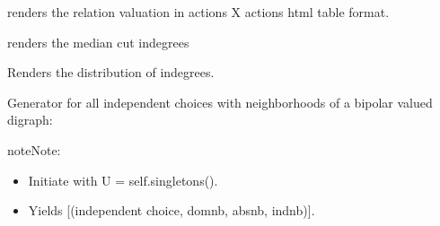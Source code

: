 \documentclass[letterpaper,10pt,english]{sphinxmanual}
\begin{document}
\begin{fulllineitems}
\begin{fulllineitems}
\end{fulllineitems}


\begin{fulllineitems}
\label{techDoc:digraphs.Digraph.htmlRelationTable}
renders the relation valuation in actions X actions html table format.

\end{fulllineitems}


\begin{fulllineitems}
\label{techDoc:digraphs.Digraph.inDegrees}
renders the median cut indegrees

\end{fulllineitems}


\begin{fulllineitems}
\label{techDoc:digraphs.Digraph.inDegreesDistribution}
Renders the distribution of indegrees.

\end{fulllineitems}


\begin{fulllineitems}
\label{techDoc:digraphs.Digraph.independentChoices}
Generator for all independent choices with neighborhoods of a bipolar valued digraph:

\begin{notice}{note}{Note:}\begin{itemize}
\item {} 
Initiate with U = self.singletons().

\item {} 
Yields {[}(independent choice, domnb, absnb, indnb){]}.

\end{itemize}
\end{notice}


\end{fulllineitems}
\end{fulllineitems}
\end{document}
